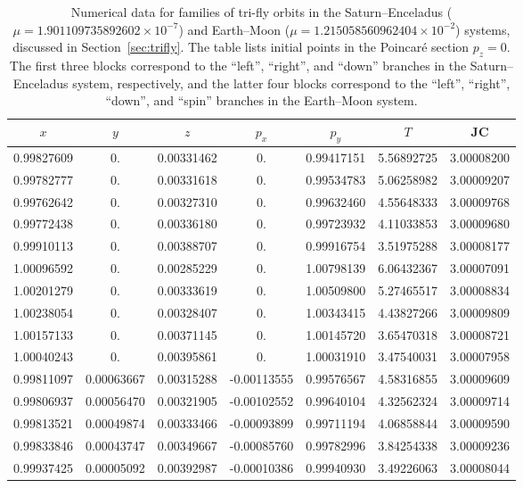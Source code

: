 \documentclass[pdflatex,sn-mathphys-ay]{sn-jnl}%
\theoremstyle{thmstyleone}%
\theoremstyle{thmstyletwo}%
\theoremstyle{thmstylethree}%
\begin{document}
\begin{table}[!h]
\centering
\caption{
Numerical data for families of tri-fly orbits in the Saturn--Enceladus ($\mu=1.901109735892602 \times 10^{-7}$) and Earth--Moon ($\mu=1.215058560962404 \times 10^{-2}$) systems, discussed in Section~\ref{sec:trifly}.
The table lists initial points in the Poincar\'e section $p_z=0$. The first three blocks correspond to the ``left'', ``right'', and ``down'' branches in the Saturn--Enceladus system, respectively, and the latter four blocks correspond to the ``left'', ``right'', ``down'', and ``spin'' branches in the Earth--Moon system.
}
\scriptsize
\label{tbl:data-trifly}
\begin{tabular}{ccccccc}
\toprule
$x$ & $y$ & $z$ & $p_x$ & $p_y$ & $T$ & JC \\ 
\midrule
\midrule
0.99827609 & 0. & 0.00331462 & 0. & 0.99417151 & 5.56892725 & 3.00008200 \\
 0.99782777 & 0. & 0.00331618 & 0. & 0.99534783 & 5.06258982 & 3.00009207 \\
 0.99762642 & 0. & 0.00327310 & 0. & 0.99632460 & 4.55648333 & 3.00009768 \\
 0.99772438 & 0. & 0.00336180 & 0. & 0.99723932 & 4.11033853 & 3.00009680 \\
 0.99910113 & 0. & 0.00388707 & 0. & 0.99916754 & 3.51975288 & 3.00008177 \\
\midrule
1.00096592 & 0. & 0.00285229 & 0. & 1.00798139 & 6.06432367 & 3.00007091 \\
 1.00201279 & 0. & 0.00333619 & 0. & 1.00509800 & 5.27465517 & 3.00008834 \\
 1.00238054 & 0. & 0.00328407 & 0. & 1.00343415 & 4.43827266 & 3.00009809 \\
 1.00157133 & 0. & 0.00371145 & 0. & 1.00145720 & 3.65470318 & 3.00008721 \\
 1.00040243 & 0. & 0.00395861 & 0. & 1.00031910 & 3.47540031 & 3.00007958 \\
\midrule
0.99811097 & 0.00063667 & 0.00315288 & -0.00113555 & 0.99576567 & 4.58316855 & 3.00009609 \\
 0.99806937 & 0.00056470 & 0.00321905 & -0.00102552 & 0.99640104 & 4.32562324 & 3.00009714 \\
 0.99813521 & 0.00049874 & 0.00333466 & -0.00093899 & 0.99711194 & 4.06858844 & 3.00009590 \\
 0.99833846 & 0.00043747 & 0.00349667 & -0.00085760 & 0.99782996 & 3.84254338 & 3.00009236 \\
 0.99937425 & 0.00005092 & 0.00392987 & -0.00010386 & 0.99940930 & 3.49226063 & 3.00008044 \\

\end{tabular}
\end{table}
\end{document}
